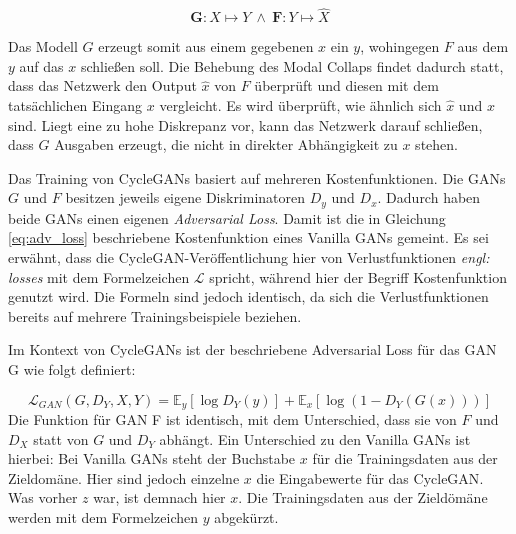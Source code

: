 \begin{equation}
	\mathbf{G}: X\mapsto Y \: \wedge \: \mathbf{F}: Y\mapsto \hat{X}
\end{equation}

Das Modell $G$ erzeugt somit aus einem gegebenen $x$ ein $y$, wohingegen $F$ aus dem $y$ auf das $x$ schließen soll. Die Behebung des Modal Collaps findet dadurch statt, dass das Netzwerk den Output $\hat{x}$ von $F$ überprüft und diesen mit dem tatsächlichen Eingang $x$ vergleicht. Es wird überprüft, wie ähnlich sich $\hat{x}$ und $x$ sind. Liegt eine zu hohe Diskrepanz vor, kann das Netzwerk darauf schließen, dass $G$ Ausgaben erzeugt, die nicht in direkter Abhängigkeit zu $x$ stehen. \cite{cycleGAN}

Das Training von \acp{CycleGAN} basiert auf mehreren Kostenfunktionen. Die \acp{GAN} $G$ und $F$ besitzen jeweils eigene Diskriminatoren $D_y$ und $D_x$. Dadurch haben beide \acp{GAN} einen eigenen \emph{Adversarial Loss}. Damit ist die in Gleichung \ref{eq:adv_loss} beschriebene Kostenfunktion eines Vanilla \acp{GAN} gemeint. Es sei erwähnt, dass die \ac{CycleGAN}-Veröffentlichung hier von Verlustfunktionen \emph{engl: losses} mit dem Formelzeichen $\mathcal{L}$ spricht, während hier der Begriff Kostenfunktion genutzt wird. Die Formeln sind jedoch identisch, da sich die Verlustfunktionen bereits auf mehrere Trainingsbeispiele beziehen. \cite{cycleGAN}

Im Kontext von \acp{CycleGAN} ist der beschriebene Adversarial Loss für das \ac{GAN} G wie folgt definiert: \cite{cycleGAN}

\begin{equation}
	\mathcal{L}_{GAN}(G, D_Y, X, Y) = \mathbb{E}_y[\log{D_Y(y)}] + \mathbb{E}_x[\log(1-D_Y(G(x)))]
\end{equation}
Die Funktion für \ac{GAN} F ist identisch, mit dem Unterschied, dass sie von $F$ und $D_X$ statt von $G$ und $D_Y$ abhängt. Ein Unterschied zu den Vanilla \acp{GAN} ist hierbei: Bei Vanilla \acp{GAN} steht der Buchstabe $x$ für die Trainingsdaten aus der Zieldomäne. Hier sind jedoch einzelne $x$ die Eingabewerte für das \ac{CycleGAN}. Was vorher $z$ war, ist demnach hier $x$. Die Trainingsdaten aus der Zieldömäne werden mit dem Formelzeichen $y$ abgekürzt. \cite{cycleGAN}

